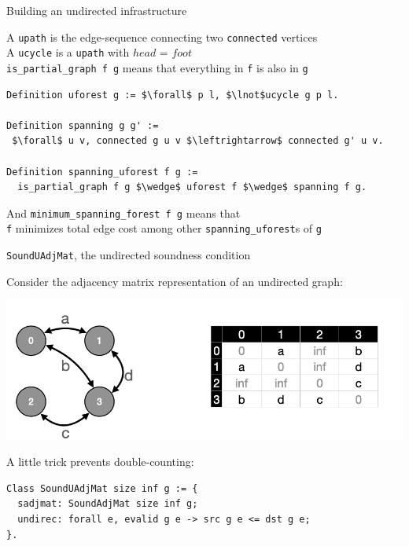 \documentclass[usenames, xcolor=dvipsnames]{beamer}
\newcommand{\m}[1]{\ensuremath{\mathit{#1}}} %
\begin{document}
\begin{frame}[fragile]{Building an undirected infrastructure}

A \texttt{upath} is the edge-sequence connecting two \texttt{connected} vertices \\
A \texttt{ucycle} is a \texttt{upath} with \m{head} = \m{foot} \\
\texttt{is\_partial\_graph f g} means that everything in \texttt{f} is also in \texttt{g}
\bigskip \pause
\begin{lstlisting}
Definition uforest g := $\forall$ p l, $\lnot$ucycle g p l.

Definition spanning g g' :=
 $\forall$ u v, connected g u v $\leftrightarrow$ connected g' u v.

Definition spanning_uforest f g :=
  is_partial_graph f g $\wedge$ uforest f $\wedge$ spanning f g.
\end{lstlisting}

\bigskip \pause
And \texttt{minimum\_spanning\_forest f g} means that \\
\texttt{f} minimizes total edge cost among other \texttt{spanning\_uforest}s of \texttt{g}

\end{frame}

\begin{frame}[fragile]{\texttt{SoundUAdjMat}, the undirected soundness condition}

Consider the adjacency matrix representation of an undirected graph: \\

{\centering
\includegraphics[scale=0.5]{undirected}

}

\bigskip \pause
A little trick prevents double-counting:
\begin{Verbatim}
Class SoundUAdjMat size inf g := {
  sadjmat: SoundAdjMat size inf g;
  undirec: forall e, evalid g e -> src g e <= dst g e;
}.
\end{Verbatim}
\end{frame}
\end{document}
